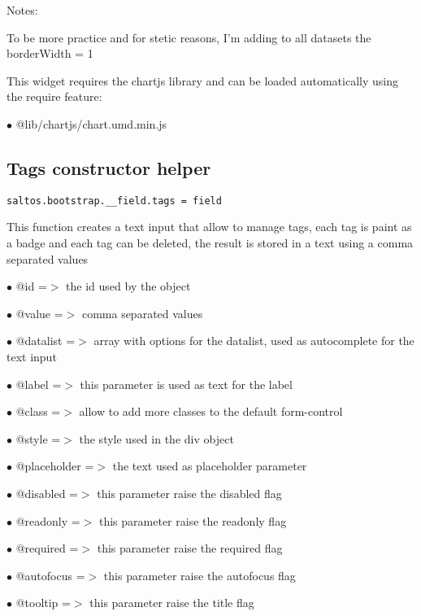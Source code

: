 \documentclass[a4paper]{book}
\begin{document}
Notes:

To be more practice and for stetic reasons, I'm adding to all datasets the borderWidth = 1

This widget requires the chartjs library and can be loaded automatically using the require
feature:

\begin{compactitem}
\item[\color{myblue}$\bullet$] @lib/chartjs/chart.umd.min.js
\end{compactitem}

\hypertarget{toc463}{}
\subsection{Tags constructor helper}

\begin{lstlisting}
saltos.bootstrap.__field.tags = field
\end{lstlisting}

This function creates a text input that allow to manage tags, each tag is paint as a badge
and each tag can be deleted, the result is stored in a text using a comma separated values

\begin{compactitem}
\item[\color{myblue}$\bullet$] @id          =$>$ the id used by the object
\item[\color{myblue}$\bullet$] @value       =$>$ comma separated values
\item[\color{myblue}$\bullet$] @datalist    =$>$ array with options for the datalist, used as autocomplete for the text input
\item[\color{myblue}$\bullet$] @label       =$>$ this parameter is used as text for the label
\item[\color{myblue}$\bullet$] @class       =$>$ allow to add more classes to the default form-control
\item[\color{myblue}$\bullet$] @style       =$>$ the style used in the div object
\item[\color{myblue}$\bullet$] @placeholder =$>$ the text used as placeholder parameter
\item[\color{myblue}$\bullet$] @disabled    =$>$ this parameter raise the disabled flag
\item[\color{myblue}$\bullet$] @readonly    =$>$ this parameter raise the readonly flag
\item[\color{myblue}$\bullet$] @required    =$>$ this parameter raise the required flag
\item[\color{myblue}$\bullet$] @autofocus   =$>$ this parameter raise the autofocus flag
\item[\color{myblue}$\bullet$] @tooltip     =$>$ this parameter raise the title flag
\end{compactitem}
\end{document}
